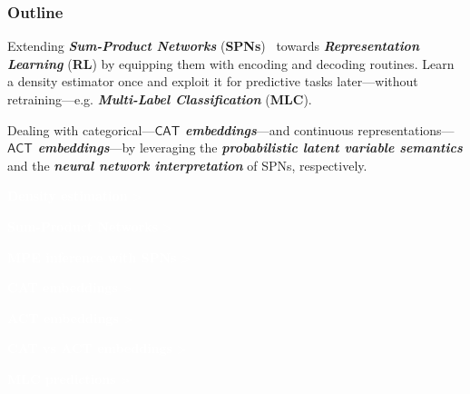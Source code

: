 \documentclass[xcolor={usenames,dvipsnames,svgnames}, compress]{beamer}
\newcommand{\highlighttext}[2][yellow]{{\colorbox{#1}{\textcolor{white}{#2}}}}
\begin{document}


{
  \begin{frame}
    \titlepage
  \end{frame}
}

\begin{frame}[t]
  \frametitle{Outline}
  \footnotesize

  Extending \emph{\textbf{Sum-Product Networks}}
  (\textbf{SPNs})~\emph{\parencite{Poon2011}} towards \emph{\textbf{Representation
  Learning}} (\textbf{RL}) by equipping them with encoding and decoding
  routines.
  Learn a density estimator once and exploit it for predictive tasks
  later---without retraining---e.g. \emph{\textbf{Multi-Label Classification}} (\textbf{MLC}).\par\bigskip


  Dealing with categorical---\emph{\textbf{$\mathsf{CAT}$ embeddings}}---and
  continuous  representations---\emph{\textbf{$\mathsf{ACT}$
      embeddings}}---by leveraging the \emph{\textbf{probabilistic latent variable semantics}}
   and the \emph{\textbf{neural network interpretation}} of SPNs, respectively.\par\bigskip


  \highlighttext[tomato2]{\textbf{Density estimation} >}\par
  \hspace{20pt} \highlighttext[tomato3]{\textbf{Sum-Product Networks} >}\par
  \hspace{40pt} \highlighttext[tomato5]{\textbf{MPE inference with SPNs} >}\par
  \hspace{60pt} \highlighttext[bgrey0]{\textbf{CAT embeddings} >}\par
  \hspace{80pt} \highlighttext[bgrey1]{\textbf{ACT embeddings} >}\par
  \hspace{100pt} \highlighttext[bgrey2]{\textbf{CAT vs ACT embeddings} >} \par
  \hspace{120pt} \highlighttext[peas1]{\textbf{MLC predictions} >}\par
  \par\bigskip

  
\end{frame}
\end{document}
